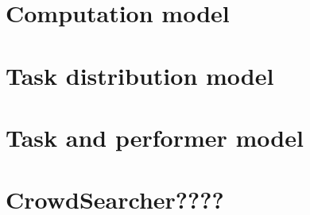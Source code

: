 





\section{Computation model}
\label{sec:model:computation}


\section{Task distribution model}
\label{sec:model:distribution}


\section{Task and performer model}
\label{sec:model:performer}



\section{CrowdSearcher????}
\label{sec:model:cs}
